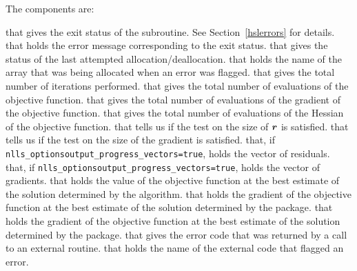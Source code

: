 
The components are:
\begin{description}
that gives the exit status of the subroutine.  See Section~\ref{hslerrors} for details.
 that holds the error message corresponding to the exit status.
 that gives the status of the last attempted allocation/deallocation.
 that holds the name of the array that was being allocated when an error was flagged.
 that gives the total number of iterations performed.
 that gives the total number of evaluations of the objective function.
 that gives the total number of evaluations of the gradient of the objective function.
 that gives the total number of evaluations of the Hessian of the objective function.
 that tells us if the test on the size of \({\bm r}\) is satisfied.
 that tells us if the test on the size of the gradient is satisfied.
 that, if {\tt nlls\_options\ct output\_progress\_vectors=true}, holds the vector of residuals.
 that, if {\tt nlls\_options\ct output\_progress\_vectors=true}, holds the vector of gradients.
 that holds the value of the objective function at the best estimate of the solution determined by the algorithm.
 that holds the gradient of the objective function at the best estimate of the solution determined by the package.
 that holds the gradient of the objective function at the best estimate of the solution determined by the package.
 that gives the error code that was returned by a call to an external routine.
 that holds the name of the external code that flagged an error.
\end{description}


